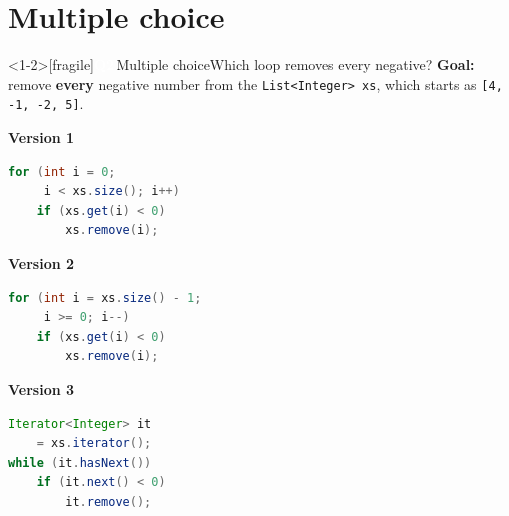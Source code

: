 \documentclass[aspectratio=169]{beamer}
\newcommand{\code}[1]{\texttt{#1}}
\newcommand{\neutrallabel}[1]{\textcolor{bkblue}{\textbf{#1}}}
\newcommand{\qb}[2]{\colorbox{bkblue}{\textcolor{white}{\normalsize\bfseries\sffamily Q#1}}\,{\normalsize\sffamily\textcolor{bkblue!75}{#2}}\enspace}
\begin{document}
\section{Multiple choice}

\begin{frame}<1-2>[fragile]{\qb{2}{Multiple choice}Which loop removes every negative?}
  \neutrallabel{Goal:} {\small remove \textbf{every} negative number from the
  \code{List<Integer> xs}, which starts as \mbox{\code{[4, -1, -2, 5]}}.}\\[0.1em]
  \begin{minipage}[t]{0.315\textwidth}
    \neutrallabel{Version 1}
\begin{lstlisting}[language=Java]
for (int i = 0;
     i < xs.size(); i++)
    if (xs.get(i) < 0)
        xs.remove(i);
\end{lstlisting}
  \end{minipage}\hfill
  \begin{minipage}[t]{0.315\textwidth}
    \neutrallabel{Version 2}
\begin{lstlisting}[language=Java]
for (int i = xs.size() - 1;
     i >= 0; i--)
    if (xs.get(i) < 0)
        xs.remove(i);
\end{lstlisting}
  \end{minipage}\hfill
  \begin{minipage}[t]{0.315\textwidth}
    \neutrallabel{Version 3}
\begin{lstlisting}[language=Java]
Iterator<Integer> it
    = xs.iterator();
while (it.hasNext())
    if (it.next() < 0)
        it.remove();
\end{lstlisting}
  \end{minipage}


\end{frame}
\end{document}

